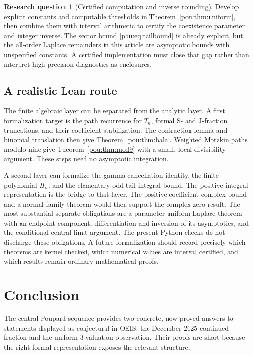 \documentclass[11pt]{article}
\theoremstyle{definition}
\newtheorem{question}{Research question}
\theoremstyle{remark}
\begin{document}
\begin{question}[Certified computation and inverse rounding]
Develop explicit constants and computable thresholds in
Theorem~\ref{pou:thm:uniform}, then combine them with interval arithmetic to
certify the coexistence parameter and integer inverse.  The sector bound
\eqref{pou:eq:tailbound} is already explicit, but the all-order Laplace
remainders in this article are asymptotic bounds with unspecified
constants.  A certified implementation must close that gap rather than
interpret high-precision diagnostics as enclosures.
\end{question}

\subsection{A realistic Lean route}

The finite algebraic layer can be separated from the analytic layer.
A first formalization target is the path recurrence for $T_n$, formal
S- and J-fraction truncations, and their coefficient stabilization.
The contraction lemma and binomial translation then give
Theorem~\ref{pou:thm:bala}.  Weighted Motzkin paths modulo nine give
Theorem~\ref{pou:thm:mod9} with a small, local divisibility argument.
These steps need no asymptotic integration.

A second layer can formalize the gamma cancellation identity, the
finite polynomial $H_n$, and the elementary odd-tail integral bound.
The positive integral representation is the bridge to that layer.
The positive-coefficient complex bound and a normal-family theorem would
then support the complex zero result.
The most substantial separate obligations are a parameter-uniform
Laplace theorem with an endpoint component, differentiation and inversion
of its asymptotics, and the conditional central limit argument.
The present Python checks do not discharge those obligations.  A future
formalization should record precisely which theorems are kernel checked,
which numerical values are interval certified, and which results remain
ordinary mathematical proofs.

\section{Conclusion}

The central Poupard sequence provides two concrete, now-proved answers to
statements displayed as conjectural in OEIS: the December 2025 continued
fraction and the uniform $3$-valuation observation.  Their proofs are
short because the right formal representation exposes the relevant
structure.
\end{document}

